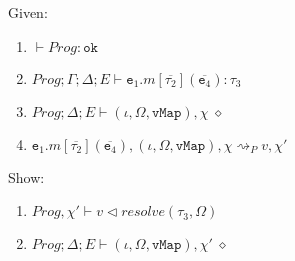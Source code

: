 Given:
\begin{enumerate}[label=\arabic*)]
    \item \label{proof:m-1} $\vdash Prog : \texttt{ok}$
    \item \label{proof:m-2} $Prog; \Gamma; \Delta; E \vdash \texttt{e}_1.m[\overline{\tau_2}](\overline{\texttt{e}_4}) : \tau_3$
    \item \label{proof:m-3} $Prog; \Delta; E \vdash (\iota, \Omega, \texttt{vMap}), \chi \; \diamond$
    \item \label{proof:m-4} $\texttt{e}_1.m[\overline{\tau_2}](\overline{\texttt{e}_4}), (\iota, \Omega, \texttt{vMap}), \chi \rightsquigarrow_P v, \chi' $
\end{enumerate}
Show:
\begin{enumerate}[label=\arabic*), resume]
    \item \label{proof:m-5} $Prog, \chi' \vdash v \triangleleft resolve(\tau_3, \Omega)$
    \item \label{proof:m-6} $Prog; \Delta; E \vdash (\iota, \Omega, \texttt{vMap}), \chi' \; \diamond$
\end{enumerate}
